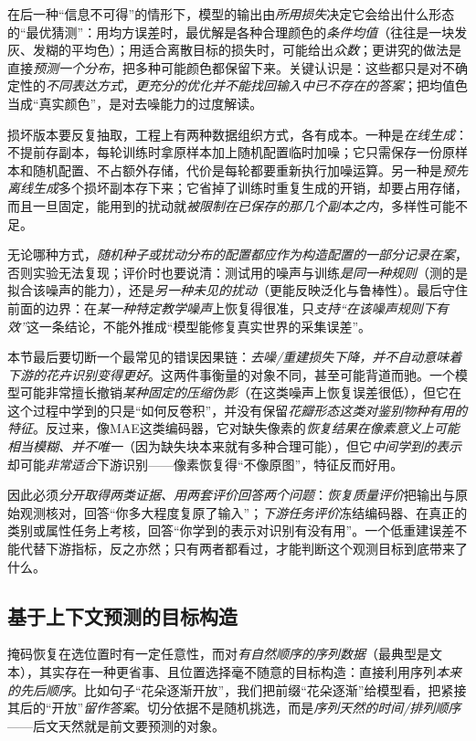 在后一种“信息不可得”的情形下，模型的输出由\emph{所用损失}决定它会给出什么形态的“最优猜测”：用均方误差时，最优解是各种合理颜色的\emph{条件均值}（往往是一块发灰、发糊的平均色）；用适合离散目标的损失时，可能给出\emph{众数}；更讲究的做法是直接\emph{预测一个分布}，把多种可能颜色都保留下来。关键认识是：这些都只是对不确定性的\emph{不同表达方式}，\emph{更充分的优化并不能找回输入中已不存在的答案}；把均值色当成“真实颜色”，是对去噪能力的过度解读。

损坏版本要反复抽取，工程上有两种数据组织方式，各有成本。一种是\emph{在线生成}：不提前存副本，每轮训练时拿原样本加上随机配置临时加噪；它只需保存一份原样本和随机配置、不占额外存储，代价是每轮都要重新执行加噪运算。另一种是\emph{预先离线生成}多个损坏副本存下来；它省掉了训练时重复生成的开销，却要占用存储，而且一旦固定，能用到的扰动就\emph{被限制在已保存的那几个副本之内}，多样性可能不足。

无论哪种方式，\emph{随机种子或扰动分布的配置都应作为构造配置的一部分记录在案}，否则实验无法复现；评价时也要说清：测试用的噪声与训练\emph{是同一种规则}（测的是拟合该噪声的能力），还是\emph{另一种未见的扰动}（更能反映泛化与鲁棒性）。最后守住前面的边界：在\emph{某一种特定教学噪声}上恢复得很准，只\emph{支持“在该噪声规则下有效”}这一条结论，不能外推成“模型能修复真实世界的采集误差”。

本节最后要切断一个最常见的错误因果链：\emph{去噪/重建损失下降，并不自动意味着下游的花卉识别变得更好}。这两件事衡量的对象不同，甚至可能背道而驰。一个模型可能非常擅长撤销\emph{某种固定的压缩伪影}（在这类噪声上恢复误差很低），但它在这个过程中学到的只是“如何反卷积”，并没有保留\emph{花瓣形态这类对鉴别物种有用的特征}。反过来，像MAE这类编码器，它对缺失像素的\emph{恢复结果在像素意义上可能相当模糊、并不唯一}（因为缺失块本来就有多种合理可能），但它\emph{中间学到的表示}却可能\emph{非常适合}下游识别——像素恢复得“不像原图”，特征反而好用。

因此必须\emph{分开取得两类证据、用两套评价回答两个问题}：\emph{恢复质量评价}把输出与原始观测核对，回答“你多大程度复原了输入”；\emph{下游任务评价}冻结编码器、在真正的类别或属性任务上考核，回答“你学到的表示对识别有没有用”。一个低重建误差不能代替下游指标，反之亦然；只有两者都看过，才能判断这个观测目标到底带来了什么。

\subsection{基于上下文预测的目标构造}
\label{sec:data-derived-knowledge-context-prediction}

掩码恢复在选位置时有一定任意性，而对\emph{有自然顺序的序列数据}（最典型是文本），其实存在一种更省事、且位置选择毫不随意的目标构造：直接利用序列\emph{本来的先后顺序}。比如句子“花朵逐渐开放”，我们把前缀“花朵逐渐”给模型看，把紧接其后的“开放”\emph{留作答案}。切分依据不是随机挑选，而是\emph{序列天然的时间/排列顺序}——后文天然就是前文要预测的对象。

